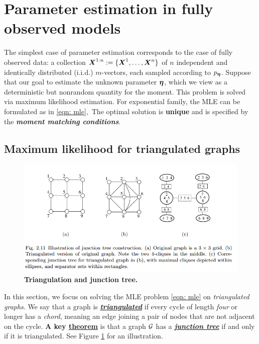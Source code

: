 \documentclass[11pt]{article}
\begin{document}
\section{Parameter estimation in fully observed models}
The simplest case of parameter estimation corresponds to the case of fully observed data: a collection $\boldsymbol{X}^{1:n} := \{\boldsymbol{X}^1,\ldots, \boldsymbol{X}^n\}$ of $n$ independent
and identically distributed (i.i.d.) $m$-vectors, each sampled according to $p_{\boldsymbol{\eta}}$. Suppose that our goal to estimate the unknown parameter $\boldsymbol{\eta}$, which
we view as a deterministic but nonrandom quantity for the moment. This problem is solved via maximum likelihood estimation. For exponential family, the MLE can be formulated as in \eqref{eqn: mle},\ The optimal solution is \textbf{unique} and is specified by the \textbf{\emph{moment matching conditions}}.
\subsection{Maximum likelihood for triangulated graphs}
\begin{figure}
\begin{minipage}[t]{1\linewidth}
  \centering
  \centerline{\includegraphics[scale = 0.5]{triangulation_junction_tree.png}}
\end{minipage}
\caption{\footnotesize{\textbf{Triangulation and junction tree. \citep{wainwright2008graphical}}}}
\label{fig: triangulation_junction_tree}
\end{figure}
In this section, we focus on solving the MLE problem \eqref{eqn: mle} on \emph{triangulated graphs}. We say that a graph is \underline{\emph{\textbf{triangulated}}} if every cycle of length \emph{four} or longer has a \emph{chord}, meaning an edge joining a pair of nodes that are not adjacent on the cycle. \textbf{A key \underline{theorem}} is that a graph ${\mathcal G}$ has a \underline{\emph{\textbf{junction tree}}} if and only if it is triangulated. See Figure \ref{fig: triangulation_junction_tree} for an illustration. 
\end{document}
